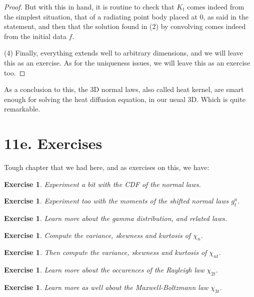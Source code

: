 \documentclass[12pt]{amsbook}
\newtheorem{exercise}[theorem]{Exercise}
\begin{document}
\begin{proof}
But with this in hand, it is routine to check that $K_t$ comes indeed from the simplest situation, that of a radiating point body placed at $0$, as said in the statement, and then that the solution found in (2) by convolving comes indeed from the initial data $f$.

\medskip

(4) Finally, everything extends well to arbitrary dimensions, and we will leave this as an exercise. As for the uniqueness issues, we will leave this as an exercise too.
\end{proof}

As a conclusion to this, the 3D normal laws, also called heat kernel, are smart enough for solving the heat diffusion equation, in our usual 3D. Which is quite remarkable.

\section*{11e. Exercises}

Tough chapter that we had here, and as exercises on this, we have:

\begin{exercise}
Experiment a bit with the CDF of the normal laws.
\end{exercise}

\begin{exercise}
Experiment too with the moments of the shifted normal laws $g_t^a$.
\end{exercise}

\begin{exercise}
Learn more about the gamma distribution, and related laws.
\end{exercise}

\begin{exercise}
Compute the variance, skewness and kurtosis of $\chi_n$.
\end{exercise}

\begin{exercise}
Then compute the variance, skewness and kurtosis of $\chi_{nt}$.
\end{exercise}

\begin{exercise}
Learn more about the occurences of the Rayleigh law $\chi_{2t}$.
\end{exercise}

\begin{exercise}
Learn more as well about the Maxwell-Boltzmann law $\chi_{3t}$.
\end{exercise}
\end{document}
